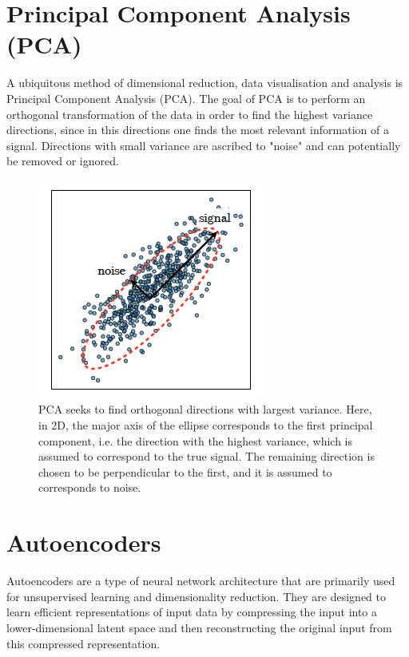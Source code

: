 \documentclass{report}
\begin{document}
\section{Principal Component Analysis (PCA)}

A ubiquitous method of dimensional reduction, data visualisation and analysis is Principal Component Analysis (PCA). The goal of PCA is to perform an orthogonal transformation of the data in order to find the highest variance directions, since in this directions one finds the most relevant information of a signal. Directions with small variance are ascribed to "noise" and can potentially be removed or ignored.
\begin{figure}[ht!]
	\centering
	\includegraphics[scale =0.7]{images/PCA_var.png}	
	\caption{PCA seeks to find orthogonal directions with largest variance. Here, in 2D, the major axis of the ellipse corresponds to the first principal component, i.e. the direction with the highest variance, which is assumed to correspond to the true signal. The remaining direction is chosen to be perpendicular to the first, and it is assumed to corresponds to noise.}
\end{figure}





\section{Autoencoders}

Autoencoders are a type of neural network architecture that are primarily used for unsupervised learning and dimensionality reduction. They are designed to learn efficient representations of input data by compressing the input into a lower-dimensional latent space and then reconstructing the original input from this compressed representation.
\end{document}
